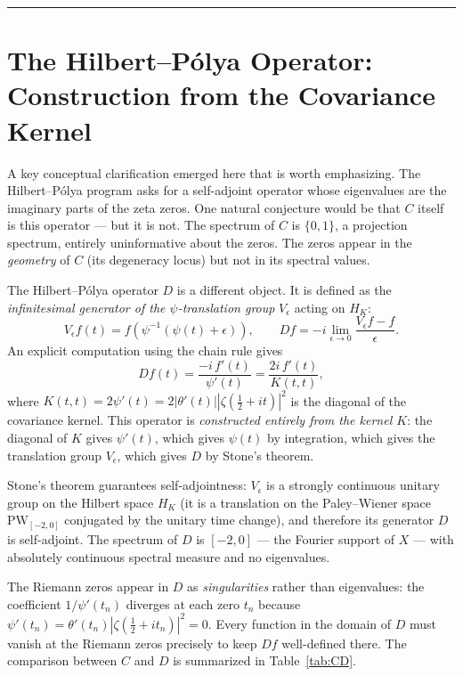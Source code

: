 \documentclass[12pt]{article}
\begin{document}
\bigskip
\hrule
\bigskip

\section{The Hilbert--P\'{o}lya Operator: Construction from the Covariance Kernel}

A key conceptual clarification emerged here that is worth emphasizing. The
Hilbert--P\'{o}lya program asks for a self-adjoint operator whose eigenvalues are the
imaginary parts of the zeta zeros. One natural conjecture would be that $C$ itself is
this operator --- but it is not. The spectrum of $C$ is $\{0,1\}$, a projection
spectrum, entirely uninformative about the zeros. The zeros appear in the
\textit{geometry} of $C$ (its degeneracy locus) but not in its spectral values.

The Hilbert--P\'{o}lya operator $D$ is a different object. It is defined as the
\textit{infinitesimal generator of the $\psi$-translation group} $V_\epsilon$ acting on
$H_K$:
\[
    V_\epsilon f(t) = f(\psi^{-1}(\psi(t) + \epsilon)),
    \qquad
    Df = -i\lim_{\epsilon\to 0}\frac{V_\epsilon f - f}{\epsilon}.
\]
An explicit computation using the chain rule gives
\[
    Df(t)
    = \frac{-i\,f'(t)}{\psi'(t)}
    = \frac{2i\,f'(t)}{K(t,t)},
\]
where $K(t,t) = 2\psi'(t) = 2|\theta'(t)||\zeta(\tfrac{1}{2}+it)|^2$ is the diagonal
of the covariance kernel. This operator is \textit{constructed entirely from the kernel
$K$}: the diagonal of $K$ gives $\psi'(t)$, which gives $\psi(t)$ by integration, which
gives the translation group $V_\epsilon$, which gives $D$ by Stone's theorem.

Stone's theorem guarantees self-adjointness: $V_\epsilon$ is a strongly continuous
unitary group on the Hilbert space $H_K$ (it is a translation on the Paley--Wiener
space $\mathrm{PW}_{[-2,0]}$ conjugated by the unitary time change), and therefore its
generator $D$ is self-adjoint. The spectrum of $D$ is $[-2,0]$ --- the Fourier support
of $X$ --- with absolutely continuous spectral measure and no eigenvalues.

The Riemann zeros appear in $D$ as \textit{singularities} rather than eigenvalues: the
coefficient $1/\psi'(t_n)$ diverges at each zero $t_n$ because
$\psi'(t_n) = \theta'(t_n)|\zeta(\tfrac{1}{2}+it_n)|^2 = 0$. Every function in the
domain of $D$ must vanish at the Riemann zeros precisely to keep $Df$ well-defined
there. The comparison between $C$ and $D$ is summarized in Table~\ref{tab:CD}.
\end{document}
